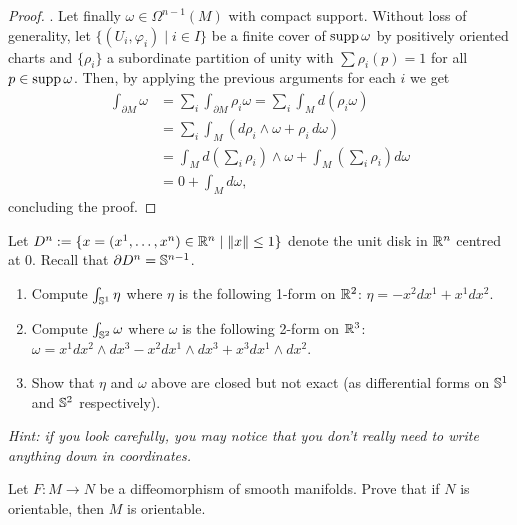 \begin{proof}
	.
	Let finally $\omega\in\Omega^{n-1}(M)$ with compact support.
	Without loss of generality, let $\{(U_i, \varphi_i)\mid i\in I\}$ be a finite cover of $\operatorname{supp} \omega$ by positively oriented charts and $\{\rho_i\}$ a subordinate partition of unity with $\sum \rho_i(p) = 1$ for all $p\in\operatorname{supp} \omega$.
	Then, by applying the previous arguments for each $i$ we get
	\begin{align}
		\int_{\partial M} \omega
		 & = \sum_i \int_{\partial M} \rho_i\omega
		= \sum_i \int_M d(\rho_i \omega)                                                                \\
		 & = \sum_i \int_M (d\rho_i \wedge\omega + \rho_i\, d\omega)                                    \\
		 & = \int_M d\left(\sum_i \rho_i\right)\wedge\omega + \int_M \left(\sum_i \rho_i\right) d\omega \\
		 & = 0 + \int_M d\omega,
	\end{align}
	concluding the proof.
\end{proof}

\begin{exercise}
	Let $D^n := \{x=(x^1, \ldots, x^n)\in\mathbb{R}^n \mid \|x\| \leq 1\}$ denote the unit disk in $\mathbb{R}^n$ centred at $0$. Recall that $\partial D^n = \mathbb{S}^{n-1}$.
	\begin{enumerate}
		\item Compute $\int_{\mathbb{S}^1} \eta$ where $\eta$ is the following 1-form on $\mathbb{R}^2$: $\eta = -x^2 dx^1 + x^1 dx^2$.
		\item Compute $\int_{\mathbb{S}^2} \omega$ where $\omega$ is the following 2-form on $\mathbb{R}^3$: $\omega = x^1 dx^2\wedge dx^3 - x^2 dx^1\wedge dx^3 + x^3 dx^1\wedge dx^2$.
		\item Show that $\eta$ and $\omega$ above are closed but not exact (as differential forms on $\mathbb{S}^1$ and $\mathbb{S}^2$ respectively).
	\end{enumerate}
	\textit{\small Hint: if you look carefully, you may notice that you don't really need to write anything down in coordinates.}
\end{exercise}

\begin{exercise}
	Let $F: M \to N$ be a diffeomorphism of smooth manifolds.
	Prove that if $N$ is orientable, then $M$ is orientable.
\end{exercise}

